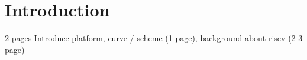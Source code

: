 \section{Introduction}
	 2 pages
    Introduce platform, curve / scheme (1 page), background about riscv (2-3 page)\\
    